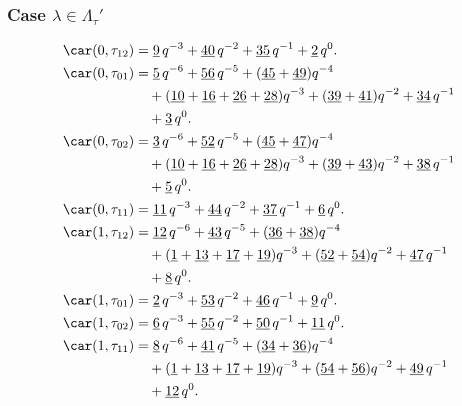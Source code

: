 
\subsubsection{Case $\lambda\in \Lambda_\tau'$}

\begin{align*}
	\car(0,\tau_{12})
	&=\underline{9}\,q^{-3}+\underline{40}\,q^{-2}+\underline{35}\,q^{-1}+\underline{2}\,q^0.\\
	\car(0,\tau_{01})
	&=\underline{5}\,q^{-6}+\underline{56}\,q^{-5}+(\underline{45}+\underline{49})q^{-4}\\
	&\quad+(\underline{10}+\underline{16}+\underline{26}+\underline{28})q^{-3}+(\underline{39}+\underline{41})q^{-2}+\underline{34}\,q^{-1}\\
	&\quad+\underline{3}\,q^0.\\
	\car(0,\tau_{02})
	&=\underline{3}\,q^{-6}+\underline{52}\,q^{-5}+(\underline{45}+\underline{47})q^{-4}\\
	&\quad+(\underline{10}+\underline{16}+\underline{26}+\underline{28})q^{-3}+(\underline{39}+\underline{43})q^{-2}+\underline{38}\,q^{-1}\\
	&\quad+\underline{5}\,q^0.\\
	\car(0,\tau_{11})
	&=\underline{11}\,q^{-3}+\underline{44}\,q^{-2}+\underline{37}\,q^{-1}+\underline{6}\,q^0.\\
	\car(1,\tau_{12})
	&=\underline{12}\,q^{-6}+\underline{43}\,q^{-5}+(\underline{36}+\underline{38})q^{-4}\\
	&\quad+(\underline{1}+\underline{13}+\underline{17}+\underline{19})q^{-3}+(\underline{52}+\underline{54})q^{-2}+\underline{47}\,q^{-1}\\
	&\quad+\underline{8}\,q^0.\\
	\car(1,\tau_{01})
	&=\underline{2}\,q^{-3}+\underline{53}\,q^{-2}+\underline{46}\,q^{-1}+\underline{9}\,q^0.\\
	\car(1,\tau_{02})
	&=\underline{6}\,q^{-3}+\underline{55}\,q^{-2}+\underline{50}\,q^{-1}+\underline{11}\,q^0.\\
	\car(1,\tau_{11})
	&=\underline{8}\,q^{-6}+\underline{41}\,q^{-5}+(\underline{34}+\underline{36})q^{-4}\\
	&\quad+(\underline{1}+\underline{13}+\underline{17}+\underline{19})q^{-3}+(\underline{54}+\underline{56})q^{-2}+\underline{49}\,q^{-1}\\
	&\quad+\underline{12}\,q^0.
\end{align*}

